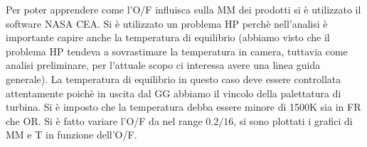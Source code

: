 \begin{appendices}








Per poter apprendere come l'O/F influisca sulla MM dei prodotti si è utilizzato il software NASA CEA. Si è utilizzato un problema HP perchè nell'analisi è importante capire anche la temperatura di equilibrio (abbiamo visto che il problema HP tendeva a sovrastimare la temperatura in camera, tuttavia come analisi preliminare, per l'attuale scopo ci interessa avere una linea guida generale). La temperatura di equilibrio in questo caso deve essere controllata attentamente poichè in uscita dal GG abbiamo il vincolo della palettatura di turbina. Si è imposto che la temperatura debba essere minore di 1500K sia in FR che OR. Si è fatto variare l'O/F da nel range $0.2 / 16$, si sono plottati i grafici di MM e T in funzione dell'O/F. 



\end{appendices}